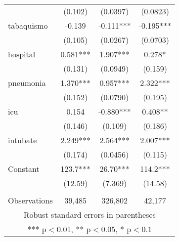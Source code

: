 \documentclass[]{article}
\begin{document}
\begin{tabular}{lccc}
 & (0.102) & (0.0397) & (0.0823) \\
tabaquismo & -0.139 & -0.111*** & -0.195*** \\
 & (0.105) & (0.0267) & (0.0703) \\
hospital & 0.581*** & 1.907*** & 0.278* \\
 & (0.131) & (0.0949) & (0.159) \\
pneumonia & 1.370*** & 0.957*** & 2.322*** \\
 & (0.152) & (0.0790) & (0.195) \\
icu & 0.154 & -0.880*** & 0.408** \\
 & (0.146) & (0.109) & (0.186) \\
intubate & 2.249*** & 2.564*** & 2.007*** \\
 & (0.174) & (0.0456) & (0.115) \\
Constant & 123.7*** & 26.70*** & 114.2*** \\
 & (12.59) & (7.369) & (14.58) \\
 &  &  &  \\
 Observations & 39,485 & 326,802 & 42,177 \\ \hline
\multicolumn{4}{c}{ Robust standard errors in parentheses} \\
\multicolumn{4}{c}{ *** p$<$0.01, ** p$<$0.05, * p$<$0.1} \\
\end{tabular}
\end{document}
